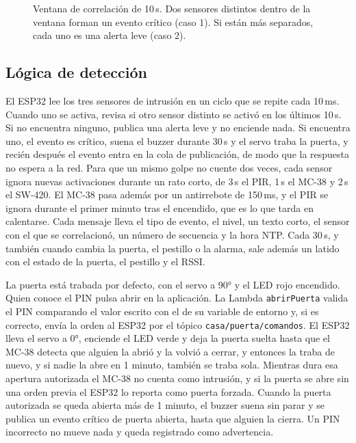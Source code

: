 \documentclass[manuscript,screen,nonacm]{acmart}
\begin{document}
\begin{figure}[htbp]
\centering
{}
\caption{Ventana de correlación de 10\,s. Dos sensores distintos dentro de la ventana forman un evento crítico (caso 1). Si están más separados, cada uno es una alerta leve (caso 2).}
\label{fig:ventana}
\end{figure}

\subsection{Lógica de detección}
El ESP32 lee los tres sensores de intrusión en un ciclo que se repite cada 10\,ms. Cuando uno se activa, revisa si otro sensor distinto se activó en los últimos 10\,s. Si no encuentra ninguno, publica una alerta leve y no enciende nada. Si encuentra uno, el evento es crítico, suena el buzzer durante 30\,s y el servo traba la puerta, y recién después el evento entra en la cola de publicación, de modo que la respuesta no espera a la red. Para que un mismo golpe no cuente dos veces, cada sensor ignora nuevas activaciones durante un rato corto, de 3\,s el PIR, 1\,s el MC-38 y 2\,s el SW-420. El MC-38 pasa además por un antirrebote de 150\,ms, y el PIR se ignora durante el primer minuto tras el encendido, que es lo que tarda en calentarse. Cada mensaje lleva el tipo de evento, el nivel, un texto corto, el sensor con el que se correlacionó, un número de secuencia y la hora NTP. Cada 30\,s, y también cuando cambia la puerta, el pestillo o la alarma, sale además un latido con el estado de la puerta, el pestillo y el RSSI.

La puerta está trabada por defecto, con el servo a 90° y el LED rojo encendido. Quien conoce el PIN pulsa abrir en la aplicación. La Lambda \texttt{abrirPuerta} valida el PIN comparando el valor escrito con el de su variable de entorno y, si es correcto, envía la orden al ESP32 por el tópico \texttt{casa/\allowbreak puerta/\allowbreak comandos}. El ESP32 lleva el servo a 0°, enciende el LED verde y deja la puerta suelta hasta que el MC-38 detecta que alguien la abrió y la volvió a cerrar, y entonces la traba de nuevo, y si nadie la abre en 1 minuto, también se traba sola. Mientras dura esa apertura autorizada el MC-38 no cuenta como intrusión, y si la puerta se abre sin una orden previa el ESP32 lo reporta como puerta forzada. Cuando la puerta autorizada se queda abierta más de 1 minuto, el buzzer suena sin parar y se publica un evento crítico de puerta abierta, hasta que alguien la cierra. Un PIN incorrecto no mueve nada y queda registrado como advertencia.
\end{document}
